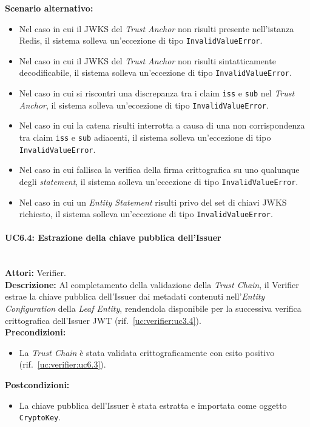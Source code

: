\noindent\textbf{Scenario alternativo:}
\begin{itemize}
    \item Nel caso in cui il JWKS del \textit{Trust Anchor} non risulti presente nell'istanza Redis, il sistema solleva un'eccezione di tipo \texttt{InvalidValueError}.
    \item Nel caso in cui il JWKS del \textit{Trust Anchor} non risulti sintatticamente decodificabile, il sistema solleva un'eccezione di tipo \texttt{InvalidValueError}.
    \item Nel caso in cui si riscontri una discrepanza tra i claim \texttt{iss} e \texttt{sub} nel \textit{Trust Anchor}, il sistema solleva un'eccezione di tipo \texttt{InvalidValueError}.
    \item Nel caso in cui la catena risulti interrotta a causa di una non corrispondenza tra claim \texttt{iss} e \texttt{sub} adiacenti, il sistema solleva un'eccezione di tipo \texttt{InvalidValueError}.
    \item Nel caso in cui fallisca la verifica della firma crittografica su uno qualunque degli \textit{statement}, il sistema solleva un'eccezione di tipo \texttt{InvalidValueError}.
    \item Nel caso in cui un \textit{Entity Statement} risulti privo del set di chiavi JWKS richiesto, il sistema solleva un'eccezione di tipo \texttt{InvalidValueError}.
\end{itemize}

\paragraph{\large\bfseries UC6.4: Estrazione della chiave pubblica dell'Issuer}
\label{uc:verifier:uc6.4}
\mbox{}\\
\noindent\textbf{Attori:} Verifier.
\\
\noindent\textbf{Descrizione:} Al completamento della validazione della \textit{Trust Chain}, il Verifier estrae la chiave pubblica dell'Issuer dai metadati contenuti nell'\textit{Entity Configuration} della \textit{Leaf Entity}, rendendola disponibile per la successiva verifica crittografica dell'Issuer JWT (rif.\ \ref{uc:verifier:uc3.4}).
\\
\noindent\textbf{Precondizioni:}
\begin{itemize}
    \item La \textit{Trust Chain} è stata validata crittograficamente con esito positivo (rif.\ \ref{uc:verifier:uc6.3}).
\end{itemize}
\noindent\textbf{Postcondizioni:}
\begin{itemize}
    \item La chiave pubblica dell'Issuer è stata estratta e importata come oggetto \texttt{CryptoKey}.
\end{itemize}


